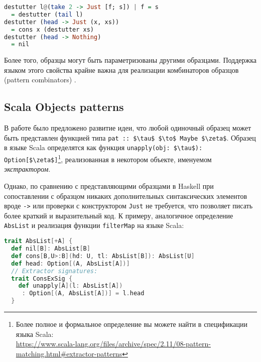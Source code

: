 \noindent
\raggedbottom
\begin{minipage}{\linewidth}
\begin{lstlisting}[language=haskell]
destutter l@(take 2 -> Just [f; s]) | f = s 
  = destutter (tail l)
destutter (head -> Just (x, xs)) 
  = cons x (destutter xs)
destutter (head -> Nothing)      
  = nil
\end{lstlisting}
\end{minipage}

Более того, образцы могут быть параметризованы другими образцами. Поддержка языком этого свойства крайне важна для реализации комбинаторов образцов (pattern combinators) \cite{tullsen2000firstclass}.

\subsection{Scala Objects patterns} \label{sec:scala_objects}
В работе \cite{emir2007objects} было предложено развитие идеи, что любой одиночный образец может быть представлен функцией типа \lstinline[breaklines]|pat :: $\tau$ $\to$ Maybe $\zeta$|. Образец в языке Scala определятся как функция \lstinline[breaklines]|unapply(obj: $\tau$):| \lstinline[breaklines]|Option[$\zeta$]|\footnote{Более полное и формальное определение вы можете найти в спецификации языка Scala: \\ \url{https://www.scala-lang.org/files/archive/spec/2.11/08-pattern-matching.html\#extractor-patterns}}, реализованная в некотором объекте, именуемом \textit{экстрактором}. 

Однако, по сравнению с представляющими образцами в Haskell при сопоставлении с образцом никаких дополнительных синтаксических элементов вроде \lstinline|->| или проверки с конструктором \lstinline|Just| не требуется, что позволяет писать более краткий и выразительный код. К примеру, аналогичное определение \lstinline|AbsList| и реализация функции \lstinline|filterMap| на языке Scala:

\noindent
\begin{minipage}{\linewidth}
\begin{lstlisting}[language=scala]
trait AbsList[+A] {
  def nil[B]: AbsList[B]
  def cons[B,U>:B](hd: U, tl: AbsList[B]): AbsList[U]
  def head: Option[(A, AbsList[A])]
  // Extractor signatures:
  trait ConsExSig {
    def unapply[A](l: AbsList[A])
     : Option[(A, AbsList[A])] = l.head
  }
\end{lstlisting}
\end{minipage}

